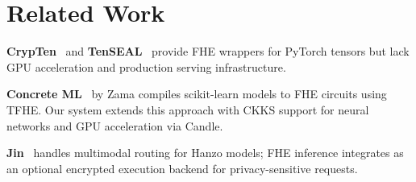 \section{Related Work}

\label{sec:related}

\textbf{CrypTen}~\cite{crypten} and \textbf{TenSEAL}~\cite{tenseal} provide
FHE wrappers for PyTorch tensors but lack GPU acceleration and production
serving infrastructure.

\textbf{Concrete ML}~\cite{concreteml} by Zama compiles scikit-learn models to
FHE circuits using TFHE. Our system extends this approach with CKKS support for
neural networks and GPU acceleration via Candle.

\textbf{Jin}~\cite{hanzojin} handles multimodal routing for Hanzo models; FHE
inference integrates as an optional encrypted execution backend for
privacy-sensitive requests.


